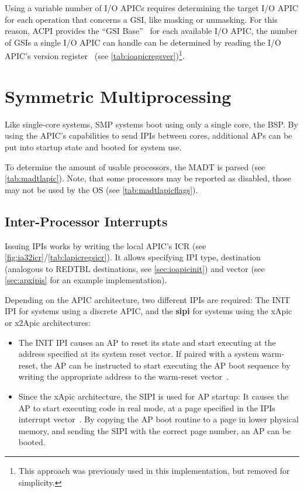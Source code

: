 Using a variable number of I/O APICs requires determining the target I/O APIC for each operation
that concerns a GSI, like masking or unmasking. For this reason, ACPI provides the ``GSI
Base''~\cite[sec.~5.2.8.2]{acpi1} for each available I/O APIC, the number of GSIs a single I/O APIC
can handle can be determined by reading the I/O APIC's version register~\cite[sec.~9.5.7]{ich5}
(see \autoref{tab:ioapicregsver})\footnote{This approach was previously used in this
  implementation, but removed for simplicity.}.

\clearpage

\section{Symmetric Multiprocessing}
\label{sec:smpinit}

Like single-core systems, SMP systems boot using only a single core, the BSP. By using the APIC's
capabilities to send IPIs between cores, additional APs can be put into startup state and booted
for system use.

To determine the amount of usable processors, the MADT is parsed (see \autoref{tab:madtlapic}).
Note, that some processors may be reported as disabled, those may not be used by the OS (see
\autoref{tab:madtlapicflags}).

\subsection{Inter-Processor Interrupts}
\label{subsec:ipis}

Issuing IPIs works by writing the local APIC's ICR (see
\autoref{fig:ia32icr}/\autoref{tab:lapicregsicr}). It allows specifying IPI type, destination
(analogous to REDTBL destinations, see \autoref{sec:ioapicinit}) and vector (see
\autoref{sec:apxipis} for an example implementation).

Depending on the APIC architecture, two different IPIs are required: The INIT IPI for systems using
a discrete APIC, and the \textbf{\gls{sipi}} for systems using the xApic or x2Apic architectures:

\begin{itemize}
  \item The INIT IPI causes an AP to reset its state and start executing at the address specified at its
        system reset vector. If paired with a system warm-reset, the AP can be instructed to start
        executing the AP boot sequence by writing the appropriate address to the warm-reset
        vector~\cite[sec.~B.4.1]{mpspec}.
  \item Since the xApic architecture, the SIPI is used for AP startup: It causes the AP to start executing
        code in real mode, at a page specified in the IPIs interrupt vector~\cite[sec.~B.4.2]{mpspec}. By
        copying the AP boot routine to a page in lower physical memory, and sending the SIPI with the
        correct page number, an AP can be booted.
\end{itemize}

